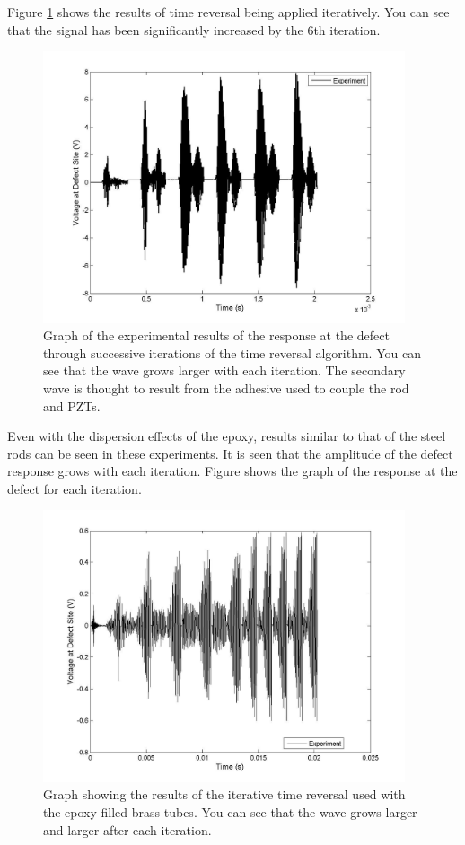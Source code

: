 \documentclass[]{aiaa-tc}%
\begin{document}
Figure \ref{fig:tr_steel2} shows the results of time reversal being applied iteratively. You can see that the signal has been significantly increased by the 6th iteration. 

\begin{figure}[H]%
\centering
 \includegraphics[height = 8cm]{tr_steel2}
 \caption{Graph of the experimental results of the response at the defect through successive iterations of the time reversal algorithm. You can see that the wave grows larger with each iteration. The secondary wave is thought to result from the adhesive used to couple the rod and PZTs.}
 \label{fig:tr_steel2}
\end{figure}

Even with the dispersion effects of the epoxy, results similar to that of the steel rods can be seen in these experiments. It is seen that the amplitude of the defect response grows with each iteration. Figure shows the graph of the response at the defect for each iteration.

\begin{figure}[H]%
\centering
 \includegraphics[height = 8cm]{tr_epoxy1}
 \caption{Graph showing the results of the iterative time reversal used with the epoxy filled brass tubes. You can see that the wave grows larger and larger after each iteration.}
 \label{fig:tr_epoxy1}
\end{figure}
\end{document}

